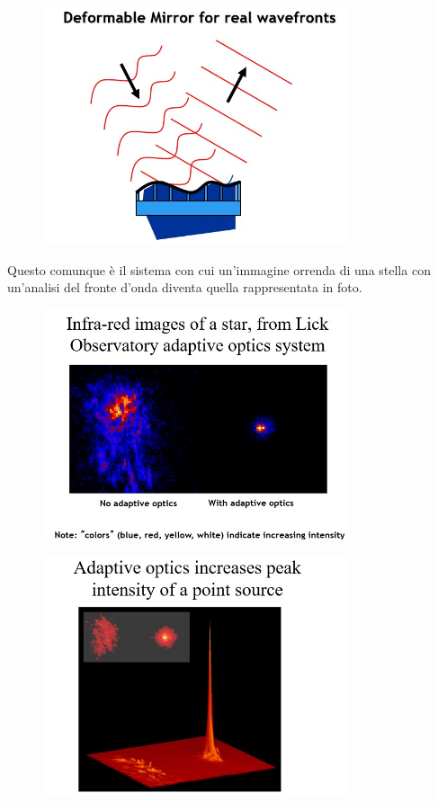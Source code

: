 \documentclass[a4paper,11pt]{article}
\begin{document}
\begin{figure}[h!!]
        \centering
        \includegraphics[width=9cm]{22.jpg}
        \label{}
    \end{figure}

Questo comunque è il sistema con cui un’immagine orrenda di una stella con un’analisi del fronte d’onda diventa quella rappresentata in foto.

\begin{figure}[h!!]
        \centering
        \includegraphics[width=9cm]{23.jpg}
        \label{}
    \end{figure}

\begin{figure}[h!!]
        \centering
        \includegraphics[width=9cm]{24.jpg}
        \label{}
    \end{figure}
\end{document}
